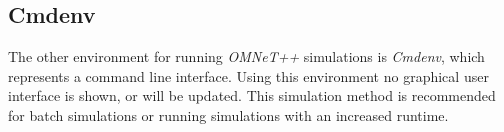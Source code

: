 
\subsection{Cmdenv}
\label{sec:omnet_running_cmdenv}
The other environment for running \emph{OMNeT++} simulations is \emph{Cmdenv}, which represents a command line interface.
Using this environment no graphical user interface is shown, or will be updated.
This simulation method is recommended for batch simulations or running simulations with an increased runtime.